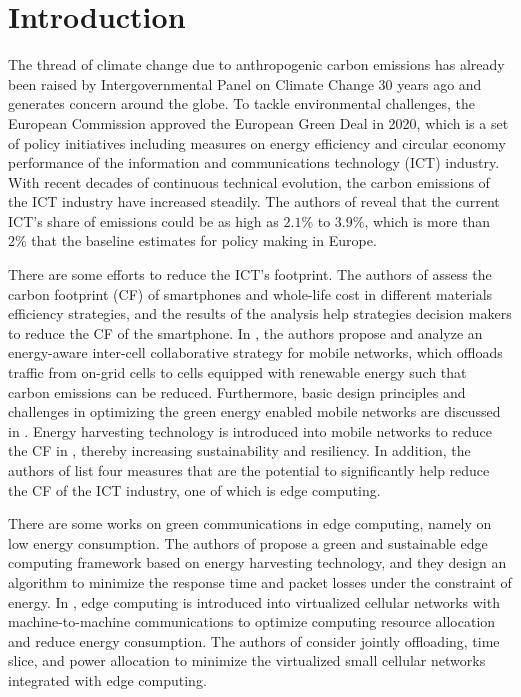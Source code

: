 \documentclass[conference, 10pt, ﬁnal, letterpaper, twocolumn]{IEEEtran}
\begin{document}
\section{Introduction}
The thread of climate change due to anthropogenic carbon emissions has already been raised by Intergovernmental Panel on Climate Change 30 years ago and generates concern around the globe. To tackle environmental challenges, the European Commission approved the European Green Deal in 2020, which is a set of policy initiatives including measures on energy efficiency and circular economy performance of the information and communications technology (ICT) industry. With recent decades of continuous technical evolution, the carbon emissions of the ICT industry have increased steadily. The authors of \cite{https://doi.org/10.48550/arxiv.2102.02622} reveal that the current ICT's share of emissions could be as high as $2.1\%$ to $3.9\%$, which is more than $2\%$ that the baseline estimates for policy making in Europe. 

There are some efforts to reduce the ICT's footprint. The authors of \cite{cordella2021reducing} assess the carbon footprint (CF) of smartphones and whole-life cost in different materials efficiency strategies, and the results of the analysis help strategies decision makers to reduce the CF of the smartphone. In \cite{Han2013on}, the authors propose and analyze an energy-aware inter-cell collaborative strategy for mobile networks, which offloads traffic from on-grid cells to cells equipped with renewable energy such that carbon emissions can be reduced. Furthermore, basic design principles and challenges in optimizing the green energy enabled mobile networks are discussed in \cite{Han2014Powering}. Energy harvesting technology is introduced into mobile networks to reduce the CF in \cite{Kwasinski2015Increasing}, thereby increasing sustainability and resiliency. In addition, the authors of \cite{perrons2021digital} list four measures that are the potential to significantly help reduce the CF of the ICT industry, one of which is edge computing.

There are some works on green communications in edge computing, namely on low energy consumption. The authors of \cite{Deng2019Parallel} propose a green and sustainable edge computing framework based on energy harvesting technology, and they design an algorithm to minimize the response time and packet losses under the constraint of energy. In \cite{Li2018Green}, edge computing is introduced into virtualized cellular networks with machine-to-machine communications to optimize computing resource allocation and reduce energy consumption. The authors of \cite{Cheng2020Distributed} consider jointly offloading, time slice, and power allocation to minimize the virtualized small cellular networks integrated with edge computing. 
\end{document}
